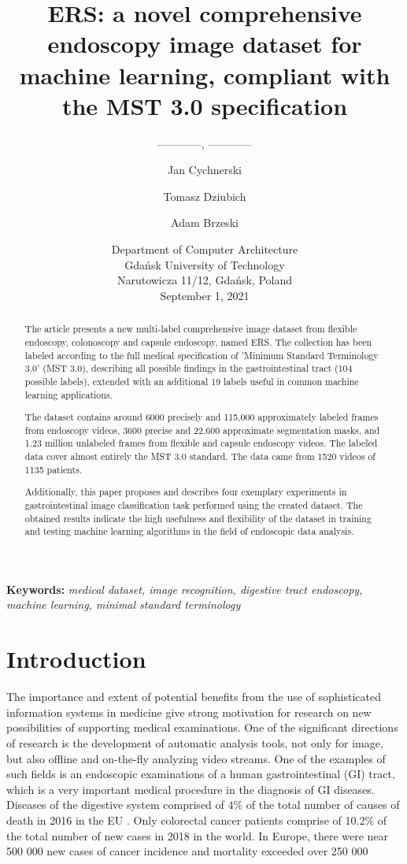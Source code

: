 \documentclass[preprint]{article}
\title{ERS: a novel comprehensive endoscopy image dataset for machine learning, compliant with the MST 3.0 specification}
\author{------------, ------------}
\author{Jan Cychnerski \orcidlink{0000-0003-2733-4599} \and Tomasz Dziubich \orcidlink{0000-0002-7991-9022} \and Adam Brzeski \orcidlink{0000-0002-1005-4315} }
\date{Department of Computer Architecture \\ Gdańsk University of Technology \\ Narutowicza 11/12, Gdańsk, Poland \\[2ex] September 1, 2021}
\begin{document}
\maketitle



\begin{abstract}

The article presents a new multi-label comprehensive image dataset from flexible endoscopy, colonoscopy and capsule endoscopy, named ERS. The collection has been labeled according to the full medical specification of 'Minimum Standard Terminology 3.0' (MST 3.0), describing all possible findings in the gastrointestinal tract (104 possible labels), extended with an additional 19 labels useful in common machine learning applications.

The dataset contains around 6000 precisely and 115,000 approximately labeled frames from endoscopy videos, 3600 precise and 22,600 approximate segmentation masks, and 1.23 million unlabeled frames from flexible and capsule endoscopy videos. The labeled data cover almost entirely the MST 3.0 standard. The data came from 1520 videos of 1135 patients.

Additionally, this paper proposes and describes four exemplary experiments in gastrointestinal image classification task performed using the created dataset. The obtained results indicate the high usefulness and flexibility of the dataset in training and testing machine learning algorithms in the field of endoscopic data analysis.

\end{abstract}


\textbf{Keywords:} \textit{
medical dataset,  image recognition, digestive tract endoscopy, machine learning, minimal standard terminology}






\section{Introduction}

The importance and extent of potential benefits from the use of sophisticated information systems in medicine give strong motivation for research on new possibilities of supporting medical examinations. One of the significant directions of research is the development of automatic analysis tools, not only for image, but also offline and on-the-fly analyzing video streams. One of the examples of such fields is an endoscopic examinations of a human gastrointestinal (GI) tract, which is a very important medical procedure in the diagnosis of GI diseases. Diseases of the digestive system comprised of 4\% of the total number of causes of death  in 2016 in the EU \cite{EU}. 
Only colorectal cancer patients comprise of 10.2\% of the total number of new cases in 2018 in the world. In Europe, there were near 500 000 new cases of cancer incidence and mortality exceeded over 250 000 \cite {WHO2018}
\end{document}
